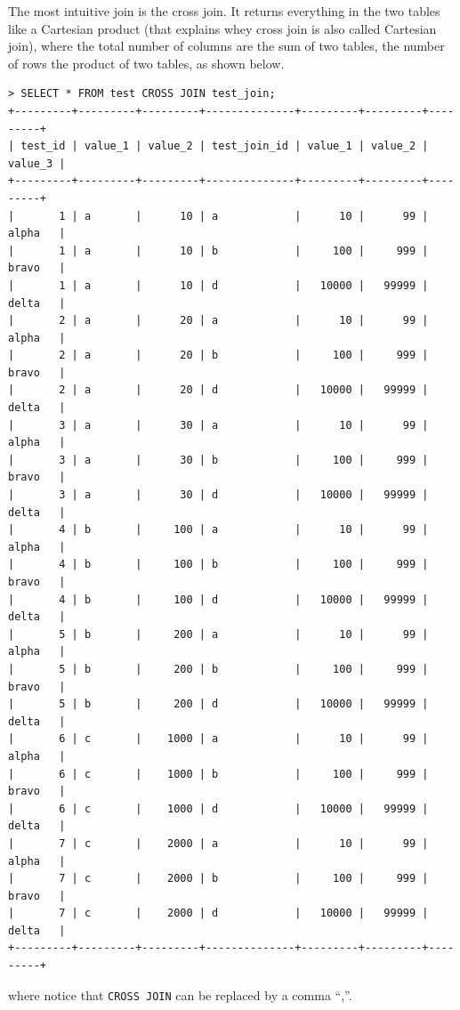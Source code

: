 The most intuitive join is the cross join. It returns everything in the two tables like a Cartesian product (that explains whey cross join is also called Cartesian join), where the total number of columns are the sum of two tables, the number of rows the product of two tables, as shown below.
\begin{lstlisting}
> SELECT * FROM test CROSS JOIN test_join;
+---------+---------+---------+--------------+---------+---------+---------+
| test_id | value_1 | value_2 | test_join_id | value_1 | value_2 | value_3 |
+---------+---------+---------+--------------+---------+---------+---------+
|       1 | a       |      10 | a            |      10 |      99 | alpha   |
|       1 | a       |      10 | b            |     100 |     999 | bravo   |
|       1 | a       |      10 | d            |   10000 |   99999 | delta   |
|       2 | a       |      20 | a            |      10 |      99 | alpha   |
|       2 | a       |      20 | b            |     100 |     999 | bravo   |
|       2 | a       |      20 | d            |   10000 |   99999 | delta   |
|       3 | a       |      30 | a            |      10 |      99 | alpha   |
|       3 | a       |      30 | b            |     100 |     999 | bravo   |
|       3 | a       |      30 | d            |   10000 |   99999 | delta   |
|       4 | b       |     100 | a            |      10 |      99 | alpha   |
|       4 | b       |     100 | b            |     100 |     999 | bravo   |
|       4 | b       |     100 | d            |   10000 |   99999 | delta   |
|       5 | b       |     200 | a            |      10 |      99 | alpha   |
|       5 | b       |     200 | b            |     100 |     999 | bravo   |
|       5 | b       |     200 | d            |   10000 |   99999 | delta   |
|       6 | c       |    1000 | a            |      10 |      99 | alpha   |
|       6 | c       |    1000 | b            |     100 |     999 | bravo   |
|       6 | c       |    1000 | d            |   10000 |   99999 | delta   |
|       7 | c       |    2000 | a            |      10 |      99 | alpha   |
|       7 | c       |    2000 | b            |     100 |     999 | bravo   |
|       7 | c       |    2000 | d            |   10000 |   99999 | delta   |
+---------+---------+---------+--------------+---------+---------+---------+
\end{lstlisting}
where notice that \verb|CROSS JOIN| can be replaced by a comma ``,''.

